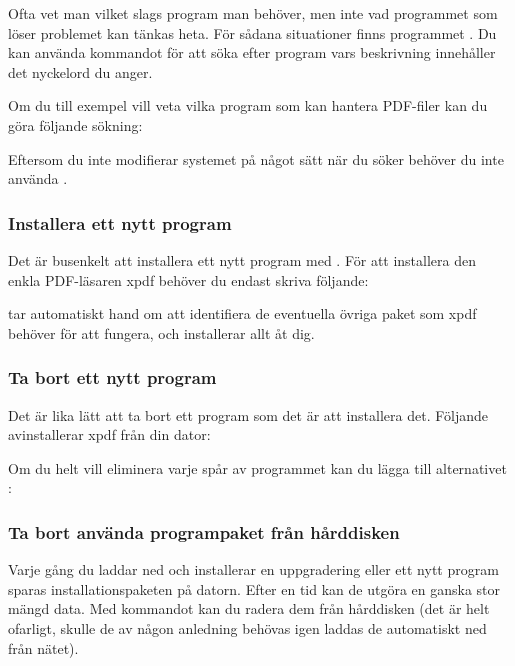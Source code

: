 \documentclass[a4paper,final]{memoir} %
\begin{document}
Ofta vet man vilket slags program man behöver, men inte vad programmet som löser problemet kan tänkas heta. För sådana situationer finns programmet . Du kan använda kommandot för att söka efter program vars beskrivning innehåller det nyckelord du anger.

Om du till exempel vill veta vilka program som kan hantera PDF-filer kan du göra följande sökning:

 

Eftersom du inte modifierar systemet på något sätt när du söker behöver du inte använda .

\subsubsection{Installera ett nytt program}

Det är busenkelt att installera ett nytt program med . För att installera den enkla PDF-läsaren xpdf behöver du endast skriva följande:


 tar automatiskt hand om att identifiera de eventuella övriga paket som xpdf behöver för att fungera, och installerar allt åt dig.

\subsubsection{Ta bort ett nytt program}

Det är lika lätt att ta bort ett program som det är att installera det. Följande avinstallerar xpdf från din dator:


Om du helt vill eliminera varje spår av programmet kan du lägga till alternativet :


\subsubsection{Ta bort använda programpaket från hårddisken}

Varje gång du laddar ned och installerar en uppgradering eller ett nytt program sparas installationspaketen på datorn. Efter en tid kan de utgöra en ganska stor mängd data. Med kommandot  kan du radera dem från hårddisken (det är helt ofarligt, skulle de av någon anledning behövas igen laddas de automatiskt ned från nätet).
\end{document}

